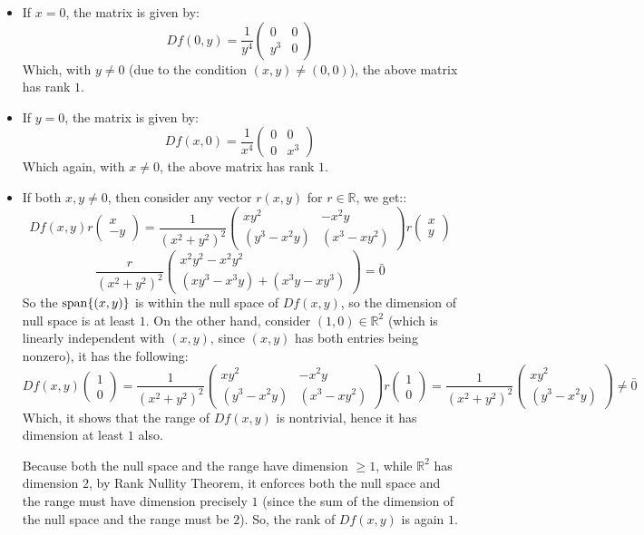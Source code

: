 \documentclass{article}
\begin{document}
\begin{itemize}
    \item If $x=0$, the matrix is given by:
    $$Df(0,y) = \frac{1}{y^4}\begin{pmatrix}
        0&0\\ y^3 & 0
    \end{pmatrix}$$
    Which, with $y\neq 0$ (due to the condition $(x,y)\neq (0,0)$), the above matrix has rank $1$.
    \item If $y=0$, the matrix is given by:
    $$Df(x,0)=\frac{1}{x^4}\begin{pmatrix}
        0&0\\0& x^3
    \end{pmatrix}$$
    Which again, with $x\neq 0$, the above matrix has rank $1$.
    \item If both $x,y\neq 0$, then consider any vector $r(x,y)$ for $r\in\mathbb{R}$, we get::
    $$Df(x,y)r\begin{pmatrix}x\\-y\end{pmatrix} =\frac{1}{(x^2+y^2)^2}\begin{pmatrix}
        xy^2&-x^2y\\
        (y^3-x^2y) & (x^3-xy^2)
    \end{pmatrix}r\begin{pmatrix}x\\y\end{pmatrix}$$
    $$\frac{r}{(x^2+y^2)^2}\begin{pmatrix}
        x^2y^2 - x^2y^2\\
        (xy^3-x^3y)+(x^3y-xy^3)
    \end{pmatrix} = \bar{0}$$
    So the $\textmd{span}\{(x,y)\}$ is within the null space of $Df(x,y)$, so the dimension of null space is at least $1$. On the other hand, consider $(1,0)\in\mathbb{R}^2$ (which is linearly independent with $(x,y)$, since $(x,y)$ has both entries being nonzero), it has the following:
    $$Df(x,y)\begin{pmatrix}1\\0\end{pmatrix} = \frac{1}{(x^2+y^2)^2}\begin{pmatrix}
        xy^2&-x^2y\\
        (y^3-x^2y) & (x^3-xy^2)
    \end{pmatrix}r\begin{pmatrix}1\\0\end{pmatrix} = \frac{1}{(x^2+y^2)^2}\begin{pmatrix}
        xy^2\\(y^3-x^2y)
    \end{pmatrix} \neq \bar{0}$$
    Which, it shows that the range of $Df(x,y)$ is nontrivial, hence it has dimension at least $1$ also.

    Because both the null space and the range have dimension $\geq 1$, while $\mathbb{R}^2$ has dimension $2$, by Rank Nullity Theorem, it enforces both the null space and the range must have dimension precisely $1$ (since the sum of the dimension of the null space and the range must be $2$).
    So, the rank of $Df(x,y)$ is again $1$.
\end{itemize}
\end{document}
